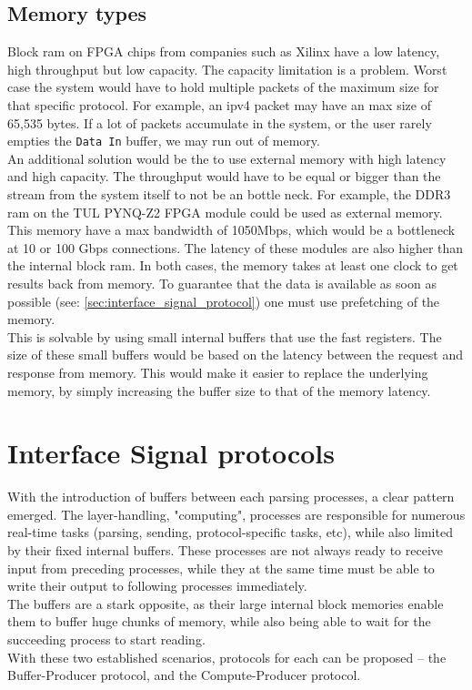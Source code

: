 \subsection{Memory types}  \label{subsec:memory_types}
Block ram on FPGA chips from companies such as Xilinx have a low latency, high
throughput but low capacity.\cite{xilinx_fpga_memory_resources}
The capacity limitation is a problem. Worst case the
system would have to hold multiple packets of the maximum size for that specific
protocol. For example, an \gls{ipv4} packet may have an max size of 65,535
bytes.\cite{RFC0791} If a lot of packets accumulate in the system, or the user
rarely empties the \texttt{Data In} buffer, we may run out of memory.\\
An additional solution would be the to use external memory with high latency
and high capacity. The throughput would have to be equal
or bigger than the stream from the system itself to not be an bottle
neck. For example, the DDR3 ram on the
TUL PYNQ\texttrademark-Z2\cite{tul_pynq} FPGA module could be used as external memory.
This memory have a max bandwidth of 1050Mbps, which would be a bottleneck
at 10 or 100 Gbps connections. The latency of these modules are also higher
than the internal block ram.
In both cases, the memory takes at least one clock to get results back from
memory. To guarantee that the data is available as soon as possible
(see: \autoref{sec:interface_signal_protocol}) one must use prefetching of the
memory.\\
This is solvable by using small internal buffers that use the fast registers.
The size of these small buffers would be based on the latency between the
request and response from memory. This would make it easier to
replace the underlying memory, by simply increasing the buffer size to that
of the memory latency.


\section{Interface Signal protocols}
\label{sec:interface_signal_protocol}
With the introduction of buffers between each parsing processes, a clear pattern
emerged. The layer-handling, "computing", processes are responsible for numerous real-time tasks
(parsing, sending, protocol-specific tasks, etc), while also limited by their
fixed internal buffers. These processes are not always ready to receive input
from preceding processes, while they at the same time must be able to write their
output to following processes immediately.\\
The buffers are a stark opposite, as their large internal block memories enable
them to buffer huge chunks of memory, while also being able to wait for the
succeeding process to start reading.\\
With these two established scenarios, protocols for each can be proposed -- the
Buffer-Producer protocol, and the Compute-Producer protocol.


